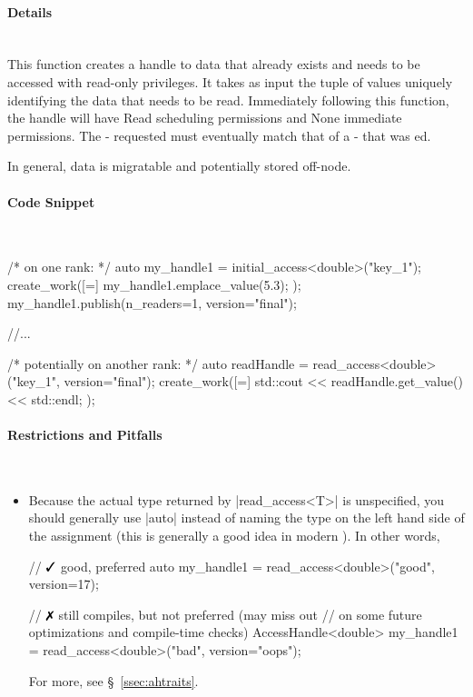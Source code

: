 \paragraph{Details}\mbox{}\\
This function creates a \gls{handle} to data that already exists and 
needs to be accessed with read-only privileges. 
It takes as input the \gls{tuple} of values uniquely 
identifying the data that needs to be read.
Immediately following this function, the \gls{handle} will have Read
\gls{scheduling permissions} and None \gls{immediate permissions}.
The - requested must eventually match that of a
- that was ed.

In general,  data is migratable and potentially stored off-node.

\paragraph{Code Snippet}\mbox{}\\
\begin{CppCodeNumb}
/* on one rank: */
auto my_handle1 = initial_access<double>("key_1");
create_work([=]{
  my_handle1.emplace_value(5.3);
});
my_handle1.publish(n_readers=1, version="final");

//...

/* potentially on another rank: */
auto readHandle = read_access<double>("key_1", version="final");
create_work([=]{
  std::cout << readHandle.get_value() << std::endl;
});
\end{CppCodeNumb}

\paragraph{Restrictions and Pitfalls}\mbox{}\\ 
\begin{itemize}
  \item Because the actual type returned by |read_access<T>| is
  unspecified, you should generally use |auto| instead of naming the type on 
  the left hand side of the assignment (this is generally a good idea in modern
  \CC{}). In other words,
  \begin{CppCode}
	// $\yes$ good, preferred
	auto my_handle1 = read_access<double>("good", version=17); 

	// $\no$ still compiles, but not preferred (may miss out
	//  on some future optimizations and compile-time checks)
	AccessHandle<double> my_handle1 = read_access<double>("bad", version="oops"); 
  \end{CppCode}
  For more, see \S~\ref{ssec:ahtraits}.
\end{itemize}
